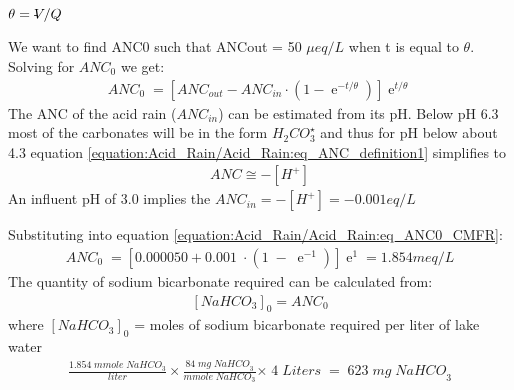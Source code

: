 \documentclass[letterpaper,10pt,english]{sphinxmanual}
\begin{document}
\(\theta = \rlap{-} V/Q\)

We want to find ANC0 such that ANCout = 50 \(\mu eq/L\) when t is equal to \(\theta\). Solving for \(ANC_{0}\) we get:
\begin{equation}\label{equation:Acid_Rain/Acid_Rain:eq_ANC0_CMFR}
\begin{split} {ANC}_{{0}} {\; }=\left[{ANC}_{out} - ANC_{in} \cdot \left(1 - {\mathop{e}\nolimits^{-t/\theta}} \right)\right]{\mathop{e}\nolimits^{t/\theta}}\end{split}
\end{equation}
The ANC of the acid rain (\(ANC_{in}\)) can be estimated from its pH. Below pH 6.3 most of the carbonates will be in the form \(H_2CO_3^{\star}\)  and thus for pH below about 4.3 equation \eqref{equation:Acid_Rain/Acid_Rain:eq_ANC_definition1} simplifies to
\begin{equation}\label{equation:Acid_Rain/Acid_Rain:Acid_Rain/Acid_Rain:7}
\begin{split}{ANC}\cong -\left[{H}^{+} \right]\end{split}
\end{equation}
An influent pH of 3.0 implies the \(ANC_{in} = -\left[H^+ \right] = -0.001 eq/L\)

Substituting into equation \eqref{equation:Acid_Rain/Acid_Rain:eq_ANC0_CMFR}:
\begin{equation}\label{equation:Acid_Rain/Acid_Rain:Acid_Rain/Acid_Rain:8}
\begin{split}{ANC}_{{0}} {\; }=\left[{0.000050}+{0.001\; }\cdot \left(1\; -\; {\mathop{e}\nolimits^{-1}} \right)\right]{\mathop{e}\nolimits^{1}} = 1.854 meq/L\end{split}
\end{equation}
The quantity of sodium bicarbonate required can be calculated from:
\begin{equation}\label{equation:Acid_Rain/Acid_Rain:Acid_Rain/Acid_Rain:9}
\begin{split}[NaHCO_3]_0 =ANC_0\end{split}
\end{equation}
where \([NaHCO_3]_0\) = moles of sodium bicarbonate required per liter of lake water
\begin{equation}\label{equation:Acid_Rain/Acid_Rain:Acid_Rain/Acid_Rain:10}
\begin{split}\frac{{1.854\; mmole\; NaHCO}_3 }{liter} {\times }\frac{{84\; mg\; NaHCO}_3 }{{mmole\; NaHCO}_3 } {\times \; 4\; Liters\; =\; 623\; mg\; NaHCO}_3\end{split}
\end{equation}
\end{document}
